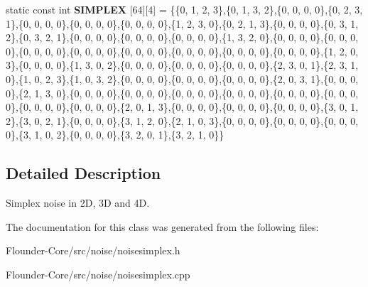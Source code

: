 \begin{DoxyCompactItemize}
\item 
\mbox{\label{classflounder_1_1noisesimplex_a7795c0a4755f633b5eae7865f040a004}} 
static const int {\bfseries S\+I\+M\+P\+L\+EX} \mbox{[}64\mbox{]}\mbox{[}4\mbox{]} = \{\{0, 1, 2, 3\},\{0, 1, 3, 2\},\{0, 0, 0, 0\},\{0, 2, 3, 1\},\{0, 0, 0, 0\},\{0, 0, 0, 0\},\{0, 0, 0, 0\},\{1, 2, 3, 0\},\{0, 2, 1, 3\},\{0, 0, 0, 0\},\{0, 3, 1, 2\},\{0, 3, 2, 1\},\{0, 0, 0, 0\},\{0, 0, 0, 0\},\{0, 0, 0, 0\},\{1, 3, 2, 0\},\{0, 0, 0, 0\},\{0, 0, 0, 0\},\{0, 0, 0, 0\},\{0, 0, 0, 0\},\{0, 0, 0, 0\},\{0, 0, 0, 0\},\{0, 0, 0, 0\},\{0, 0, 0, 0\},\{1, 2, 0, 3\},\{0, 0, 0, 0\},\{1, 3, 0, 2\},\{0, 0, 0, 0\},\{0, 0, 0, 0\},\{0, 0, 0, 0\},\{2, 3, 0, 1\},\{2, 3, 1, 0\},\{1, 0, 2, 3\},\{1, 0, 3, 2\},\{0, 0, 0, 0\},\{0, 0, 0, 0\},\{0, 0, 0, 0\},\{2, 0, 3, 1\},\{0, 0, 0, 0\},\{2, 1, 3, 0\},\{0, 0, 0, 0\},\{0, 0, 0, 0\},\{0, 0, 0, 0\},\{0, 0, 0, 0\},\{0, 0, 0, 0\},\{0, 0, 0, 0\},\{0, 0, 0, 0\},\{0, 0, 0, 0\},\{2, 0, 1, 3\},\{0, 0, 0, 0\},\{0, 0, 0, 0\},\{0, 0, 0, 0\},\{3, 0, 1, 2\},\{3, 0, 2, 1\},\{0, 0, 0, 0\},\{3, 1, 2, 0\},\{2, 1, 0, 3\},\{0, 0, 0, 0\},\{0, 0, 0, 0\},\{0, 0, 0, 0\},\{3, 1, 0, 2\},\{0, 0, 0, 0\},\{3, 2, 0, 1\},\{3, 2, 1, 0\}\}
\end{DoxyCompactItemize}


\subsection{Detailed Description}
Simplex noise in 2D, 3D and 4D. 



The documentation for this class was generated from the following files\+:\begin{DoxyCompactItemize}
\item 
Flounder-\/\+Core/src/noise/noisesimplex.\+h\item 
Flounder-\/\+Core/src/noise/noisesimplex.\+cpp\end{DoxyCompactItemize}
